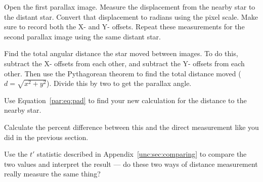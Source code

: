 \begin{steps}
	\item Open the first parallax image. Measure the displacement from the nearby star to the distant star. Convert that displacement to radians using the pixel scale. Make sure to record both the X- and Y- offsets. Repeat these measurements for the second parallax image using the same distant star.

	\item Find the total angular distance the star moved between images. To do this, subtract the X- offsets from each other, and subtract the Y- offsets from each other. Then use the Pythagorean theorem to find the total distance moved ($d = \sqrt{x^2 + y^2}$). Divide this by two to get the parallax angle.
	
	\item Use Equation\ \ref{par:eq:pad} to find your new calculation for the distance to the nearby star.
	
	\item Calculate the percent difference between this and the direct measurement like you did in the previous section.
	
	\item Use the $t'$ statistic described in Appendix\ \ref{unc:sec:comparing} to compare the two values and interpret the result --- do these two ways of distance measurement really measure the same thing?
\end{steps}


%



